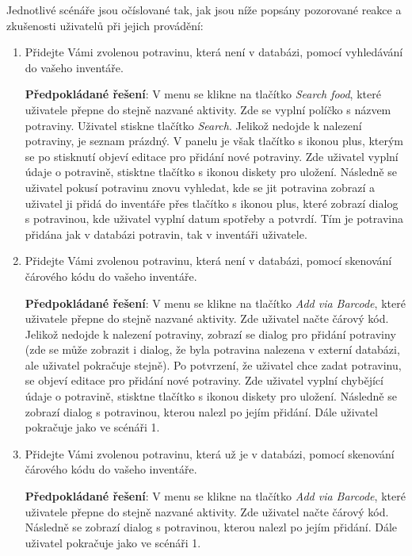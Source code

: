 \documentclass[thesis=B,czech]{FITthesis}[2013/10/20]
\begin{document}
Jednotlivé scénáře jsou očíslované tak, jak jsou níže popsány pozorované reakce a zkušenosti uživatelů při jejich provádění:
\begin{enumerate}
  \item Přidejte Vámi zvolenou potravinu, která není v databázi, pomocí vyhledávání do vašeho inventáře.
    
    \textbf{Předpokládané řešení}: V menu se klikne na tlačítko \textit{Search food}, které uživatele přepne do stejně nazvané aktivity. Zde se vyplní políčko s názvem potraviny. Uživatel stiskne tlačítko \textit{Search}. Jelikož nedojde k nalezení potraviny, je seznam prázdný. V panelu je však tlačítko s ikonou plus, kterým se po stisknutí objeví editace pro přidání nové potraviny. Zde uživatel vyplní údaje o potravině, stisktne tlačítko s ikonou diskety pro uložení. Následně se uživatel pokusí potravinu znovu vyhledat, kde se jit potravina zobrazí a uživatel ji přidá do inventáře přes tlačítko s ikonou plus, které zobrazí dialog s potravinou, kde uživatel vyplní datum spotřeby a potvrdí. Tím je potravina přidána jak v databázi potravin, tak v inventáři uživatele.

  \item Přidejte Vámi zvolenou potravinu, která není v databázi, pomocí skenování čárového kódu do vašeho inventáře.
    
    \textbf{Předpokládané řešení}: V menu se klikne na tlačítko \textit{Add via Barcode}, které uživatele přepne do stejně nazvané aktivity. Zde uživatel načte čárový kód. Jelikož nedojde k nalezení potraviny, zobrazí se dialog pro přidání potraviny (zde se může zobrazit i dialog, že byla potravina nalezena v externí databázi, ale uživatel pokračuje stejně). Po potvrzení, že uživatel chce zadat potravinu, se objeví editace pro přidání nové potraviny. Zde uživatel vyplní chybějící údaje o potravině, stisktne tlačítko s ikonou diskety pro uložení. Následně se zobrazí dialog s potravinou, kterou nalezl po jejím přidání. Dále uživatel pokračuje jako ve scénáři 1.
    
  \item Přidejte Vámi zvolenou potravinu, která už je v databázi, pomocí skenování čárového kódu do vašeho inventáře.
    
    \textbf{Předpokládané řešení}: V menu se klikne na tlačítko \textit{Add via Barcode}, které uživatele přepne do stejně nazvané aktivity. Zde uživatel načte čárový kód. Následně se zobrazí dialog s potravinou, kterou nalezl po jejím přidání. Dále uživatel pokračuje jako ve scénáři 1.
  

\end{enumerate}
\end{document}

